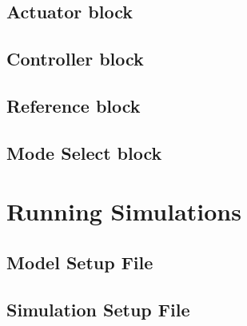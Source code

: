 \subsection{Actuator block}
\subsection{Controller block}
\subsection{Reference block}
\subsection{Mode Select block}

\section{Running Simulations}
\subsection{Model Setup File}
\subsection{Simulation Setup File}
